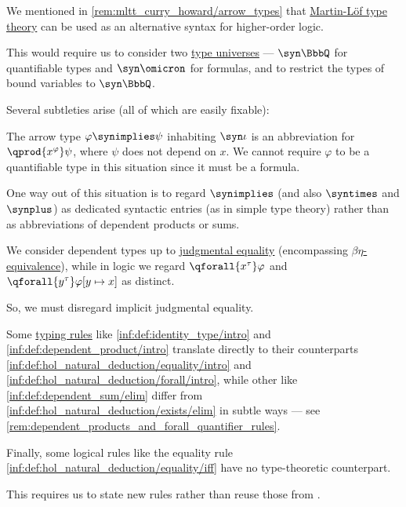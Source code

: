 \begin{remark}\label{rem:mltt_hol}
  We mentioned in \cref{rem:mltt_curry_howard/arrow_types} that \hyperref[def:martin_lof_type_theory]{Martin-L\"of type theory} can be used as an alternative syntax for higher-order logic.

  This would require us to consider two \hyperref[def:mltt_signature/universe]{type universes} --- \( \syn\BbbQ \) for quantifiable types and \( \syn\omicron \) for formulas, and to restrict the types of bound variables to \( \syn\BbbQ \).

  Several subtleties arise (all of which are easily fixable):
  \begin{thmenum}
     The arrow type \( \varphi \synimplies \psi \) inhabiting \( \syn\iota \) is an abbreviation for \( \qprod {x^\varphi} \psi \), where \( \psi \) does not depend on \( x \). We cannot require \( \varphi \) to be a quantifiable type in this situation since it must be a formula.

    One way out of this situation is to regard \( {\synimplies} \) (and also \( {\syntimes} \) and \( {\synplus} \)) as dedicated syntactic entries (as in simple type theory) rather than as abbreviations of dependent products or sums.

     We consider dependent types up to \hyperref[con:equality]{judgmental equality} (encompassing \hyperref[def:beta_eta_reduction]{\( \beta\eta \)-equivalence}), while in logic we regard \( \qforall {x^\tau} \varphi \) and \( \qforall {y^\tau} \varphi[y \mapsto x] \) as distinct.

    So, we must disregard implicit judgmental equality.

     Some \hyperref[con:typing_rule]{typing rules} like \ref{inf:def:identity_type/intro} and \ref{inf:def:dependent_product/intro} translate directly to their counterparts \ref{inf:def:hol_natural_deduction/equality/intro} and \ref{inf:def:hol_natural_deduction/forall/intro}, while other like \ref{inf:def:dependent_sum/elim} differ from \ref{inf:def:hol_natural_deduction/exists/elim} in subtle ways --- see \cref{rem:dependent_products_and_forall_quantifier_rules}.

    Finally, some logical rules like the equality rule \ref{inf:def:hol_natural_deduction/equality/iff} have no type-theoretic counterpart.

    This requires us to state new rules rather than reuse those from .
  \end{thmenum}
\end{remark}

